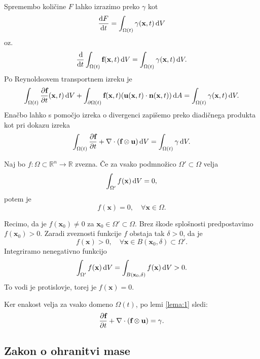 \documentclass[mat2, tisk]{fmfdelo}
\newcommand{\R}{\mathbb R}
\newcommand{\bd}{\textbf}
\begin{document}
Spremembo količine $F$ lahko izrazimo preko $\gamma$ kot 
\begin{equation}
\frac{\dif F}{\dif t} = \int_{\Omega(t)} \bd{\text{$\gamma$}}(\bd{x}, t) \dif V
\end{equation}
 oz. 
\begin{equation}
\frac{\dif}{\dif t} \int_{\Omega(t)} \bd{f}(\bd{x}, t) \dif V = \int_{\Omega(t)} \bd{\text{$\gamma$}}(\bd{x}, t) \dif V.
\end{equation}
Po Reynoldsovem transportnem izreku je
\begin{equation}
\int_{\Omega(t)} \frac{\partial \bd{f}}{\partial t}(\bd{x}, t) \dif V + \int_{\partial \Omega(t)} \bd{f}(\bd{x}, t) (\bd{u}(\bd{x}, t) \cdot \bd{n}(\bd{x}, t)) \dif A = \int_{\Omega(t)} \bd{\text{$\gamma$}}(\bd{x}, t) \dif V.
\end{equation}
Enačbo lahko s pomočjo izreka o divergenci zapišemo preko diadičnega produkta kot pri dokazu izreka 
\begin{equation}
\int_{\Omega(t)} \frac{\partial \bd{f}}{\partial t} + \nabla \cdot (\bd{f} \otimes \bd{u}) \dif V = \int_{\Omega(t)} \bd{\text{$\gamma$}} \dif V.
\end{equation}

\begin{lema}
  \label{lema:1}
Naj bo $f: \Omega \subset \R^n \rightarrow \R$ zvezna. 
Če za vsako podmnožico $\Omega' \subset \Omega$ velja 
$$
\int_{\Omega'} f(\bd{x}) \dif V = 0,
$$
potem je 
$$
f(\bd{x}) = 0, \quad \forall \bd{x} \in \Omega.
$$
\end{lema}

\begin{dokaz}
Recimo, da je $f(\bd{x}_0) \neq 0$ za $\bd{x}_0 \in \Omega' \subset \Omega$. Brez škode 
splošnosti predpostavimo $f(\bd{x}_0) > 0$. Zaradi 
zveznosti funkcije $f$ obstaja tak $\delta > 0$, da je 
$$
f(\bd{x}) > 0, \quad \forall \bd{x} \in B(\bd{x}_0, \delta) \subset \Omega'.
$$
Integriramo nenegativno funkcijo 
$$
\int_{\Omega'} f(\bd{x}) \dif V = \int_{B(\bd{x}_0, \delta)} f(\bd{x}) \dif V > 0.
$$
To vodi je protislovje, torej je $f(\bd{x}) = 0$.
\end{dokaz}

Ker enakost velja za vsako domeno $\Omega(t)$, po lemi \ref{lema:1} sledi:
\begin{equation}
\frac{\partial \bd{f}}{\partial t}+ \nabla \cdot (\bd{f} \otimes \bd{u}) = \bd{\text{$\gamma$}}.
\end{equation}

\subsection{Zakon o ohranitvi mase}
\end{document}
